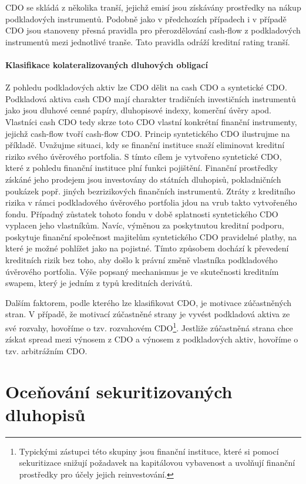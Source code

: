 \documentclass[a4paper]{book}
\begin{document}
CDO se skládá z několika tranší, jejichž emisí jsou získávány prostředky na nákup podkladových instrumentů. Podobně jako v předchozích případech i v případě CDO jsou stanoveny přesná pravidla pro přerozdělování cash-flow z podkladových instrumentů mezi jednotlivé tranše. Tato pravidla odráží kreditní rating tranší.

\subsubsection{Klasifikace kolateralizovaných dluhových obligací}

Z pohledu podkladových aktiv lze CDO dělit na cash CDO a syntetické CDO. Podkladová aktiva cash CDO mají charakter tradičních investičních instrumentů jako jsou dluhové cenné papíry, dluhopisové indexy, komerční úvěry apod. Vlastníci cash CDO tedy skrze toto CDO vlastní konkrétní finanční instrumenty, jejichž cash-flow tvoří cash-flow CDO. Princip syntetického CDO ilustrujme na příkladě. Uvažujme situaci, kdy se finanční instituce snaží eliminovat kreditní riziko svého úvěrového portfolia. S tímto cílem je vytvořeno syntetické CDO, které z pohledu finanční instituce plní funkci pojištění. Finanční prostředky získáné jeho prodejem jsou investovány do státních dluhopisů, pokladničních poukázek popř. jiných bezrizikových finančních instrumentů. Ztráty z kreditního rizika v rámci podkladového úvěrového portfolia jdou na vrub takto vytvořeného fondu. Případný zůstatek tohoto fondu v době splatnosti syntetického CDO vyplacen jeho vlastníkům. Navíc, výměnou za poskytnutou kreditní podporu, poskytuje finanční společnost majitelům syntetického CDO pravidelné platby, na které je možné pohlížet jako na pojistné. Tímto způsobem dochází k převedení kreditních rizik bez toho, aby došlo k právní změně vlastníka podkladového úvěrového portfolia. Výše popsaný mechanismus je ve skutečnosti kreditním swapem, který je jedním z typů kreditních derivátů.

Dalším faktorem, podle kterého lze klasifikovat CDO, je motivace zúčastněných stran. V případě, že motivací zúčastněné strany je vyvést podkladová aktiva ze své rozvahy, hovoříme o tzv. rozvahovém CDO\footnote{Typickými zástupci této skupiny jsou finanční instituce, které si pomocí sekuritizace snižují požadavek na kapitálovou vybavenost a uvolňují finanční prostředky pro účely jejich reinvestování.}. Jestliže zúčastněná strana chce získat spread mezi výnosem z CDO a výnosem z podkladových aktiv, hovoříme o tzv. arbitrážním CDO.

\chapter{Oceňování sekuritizovaných dluhopisů}
\end{document}

